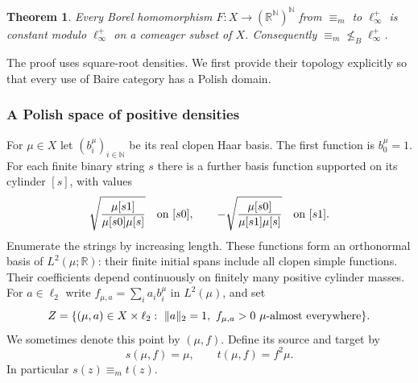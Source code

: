 \documentclass[11pt]{article}
\numberwithin{equation}{section}
\newtheorem{theorem}{Theorem}[section]
\theoremstyle{definition}
\newcommand{\N}{\mathbb N}
\newcommand{\R}{\mathbb R}
\newcommand{\meq}{\equiv_m}
\begin{document}
\begin{theorem}\label{thm:measure-jump}
Every Borel homomorphism
$F:X\to(\R^\N)^\N$ from $\meq$ to $\ell_\infty^+$ is constant modulo
$\ell_\infty^+$ on a comeager subset of $X$. Consequently
$\meq\nleq_B\ell_\infty^+$.
\end{theorem}

The proof uses square-root densities. We first provide their topology
explicitly so that every use of Baire category has a Polish domain.

\subsubsection{A Polish space of positive densities}
For $\mu\in X$ let $(b_i^\mu)_{i\in\N}$ be its real clopen Haar basis.
The first function is $b_0^\mu=1$. For each finite binary string $s$ there
is a further basis function supported on its cylinder $[s]$, with values
\[
 \sqrt{\frac{\mu[s1]}{\mu[s0]\mu[s]}}\quad\hbox{on }[s0],
 \qquad
 -\sqrt{\frac{\mu[s0]}{\mu[s1]\mu[s]}}\quad\hbox{on }[s1].
\]
Enumerate the strings by increasing length. These functions form an
orthonormal basis of $L^2(\mu;\R)$: their finite initial spans include all
clopen simple functions. Their coefficients depend continuously on
finitely many positive cylinder masses.
For $a\in\ell_2$ write
$f_{\mu,a}=\sum_i a_i b_i^\mu$ in $L^2(\mu)$, and set
\[
 Z=\{(\mu,a)\in X\times\ell_2:\ \|a\|_2=1,\
                         f_{\mu,a}>0\ \mu\hbox{-almost everywhere}\}.
\]
We sometimes denote this point by $(\mu,f)$.
Define its source and target by
\[
 s(\mu,f)=\mu,\qquad t(\mu,f)=f^2\mu.
\]
In particular $s(z)\meq t(z)$.
\end{document}

